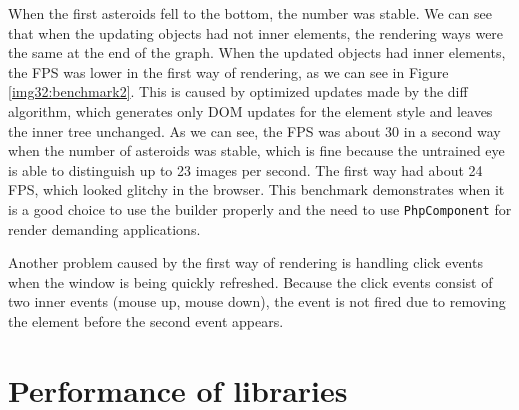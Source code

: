 When the first asteroids fell to the bottom, the number was stable.
We can see that when the updating objects had not inner elements, the rendering ways were the same at the end of the graph.
When the updated objects had inner elements, the FPS was lower in the first way of rendering, as we can see in Figure \ref{img32:benchmark2}.
This is caused by optimized updates made by the diff algorithm, which generates only DOM updates for the element style and leaves the inner tree unchanged.
As we can see, the FPS was about 30 in a second way when the number of asteroids was stable, which is fine because the untrained eye is able to distinguish up to 23 images per second.
The first way had about 24 FPS, which looked glitchy in the browser.
This benchmark demonstrates when it is a good choice to use the builder properly and the need to use \texttt{PhpComponent} for render demanding applications.
\par
Another problem caused by the first way of rendering is handling click events when the window is being quickly refreshed.
Because the click events consist of two inner events (mouse up, mouse down), the event is not fired due to removing the element before the second event appears.

\section{Performance of libraries}

